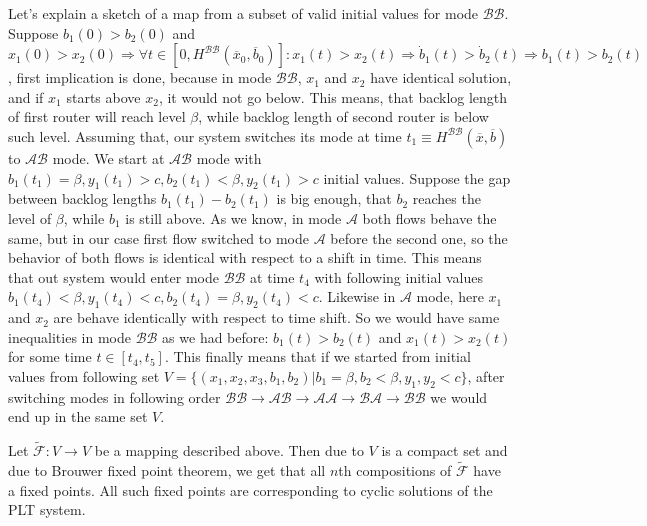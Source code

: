 Let's explain a sketch of a map from a subset of valid initial values for mode $\mathcal{BB}$. Suppose $b_1(0) > b_2(0)$ and $x_1(0) > x_2(0) \Rightarrow \forall t \in [0, H^\mathcal{BB}(\overline{x}_0, \overline{b}_0)] : x_1(t) > x_2(t) \Rightarrow \dot{b}_1(t) > \dot{b}_2(t) \Rightarrow b_1(t) > b_2(t)$, first implication is done, because in mode $\mathcal{BB}$, $x_1$ and $x_2$ have identical solution, and if $x_1$ starts above $x_2$, it would not go below. This means, that backlog length of first router will reach level $\beta$, while backlog length of second router is below such level. Assuming that, our system switches its mode at time $t_1 \equiv H^\mathcal{BB}(\overline{x}, \overline{b})$ to $\mathcal{AB}$ mode. We start at $\mathcal{AB}$ mode with $b_1(t_1) = \beta,y_1(t_1) > c, b_2(t_1) < \beta, y_2(t_1) > c$ initial values. Suppose the gap between backlog lengths $b_1(t_1) - b_2(t_1)$ is big enough, that $b_2$ reaches the level of $\beta$, while $b_1$ is still above. As we know, in mode $\mathcal{A}$ both flows behave the same, but in our case first flow switched to mode $\mathcal{A}$ before the second one, so the behavior of both flows is identical with respect to a shift in time. This means that out system would enter mode $\mathcal{BB}$ at time $t_4$ with following initial values $b_1(t_4) < \beta, y_1(t_4) < c, b_2(t_4) = \beta, y_2(t_4) < c$. Likewise in $\mathcal{A}$ mode, here $x_1$ and $x_2$ are behave identically with respect to time shift. So we would have same inequalities in mode $\mathcal{BB}$ as we had before: $b_1(t) > b_2(t)$ and $x_1(t) > x_2(t)$ for some time $t \in [ t_4, t_5 ]$. This finally means that if we started from initial values from following set $V = \{(x_1, x_2, x_3, b_1, b_2) | b_1 = \beta, b_2 < \beta, y_1, y_2 < c\}$, after switching modes in following order $\mathcal{BB} \rightarrow \mathcal{AB} \rightarrow \mathcal{AA} \rightarrow \mathcal{BA} \rightarrow \mathcal{BB}$ we would end up in the same set $V$.

Let $\tilde{\mathcal{F}}: V \rightarrow V$ be a mapping described above. Then due to $V$ is a compact set and due to Brouwer fixed point
theorem, we get that all $n$th compositions of $\tilde{\mathcal{F}}$ have a fixed points. All such fixed points are corresponding to cyclic solutions of the PLT system.